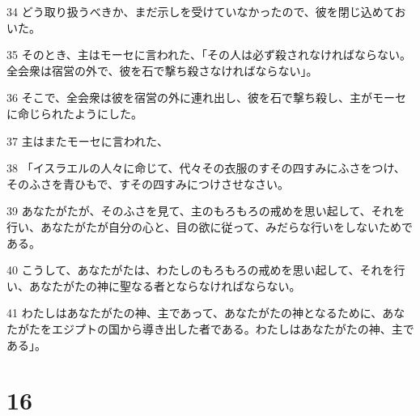\par 34 どう取り扱うべきか、まだ示しを受けていなかったので、彼を閉じ込めておいた。
\par 35 そのとき、主はモーセに言われた、「その人は必ず殺されなければならない。全会衆は宿営の外で、彼を石で撃ち殺さなければならない」。
\par 36 そこで、全会衆は彼を宿営の外に連れ出し、彼を石で撃ち殺し、主がモーセに命じられたようにした。
\par 37 主はまたモーセに言われた、
\par 38 「イスラエルの人々に命じて、代々その衣服のすその四すみにふさをつけ、そのふさを青ひもで、すその四すみにつけさせなさい。
\par 39 あなたがたが、そのふさを見て、主のもろもろの戒めを思い起して、それを行い、あなたがたが自分の心と、目の欲に従って、みだらな行いをしないためである。
\par 40 こうして、あなたがたは、わたしのもろもろの戒めを思い起して、それを行い、あなたがたの神に聖なる者とならなければならない。
\par 41 わたしはあなたがたの神、主であって、あなたがたの神となるために、あなたがたをエジプトの国から導き出した者である。わたしはあなたがたの神、主である」。

\chapter{16}

